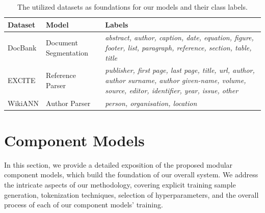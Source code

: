 \begin{table}[!ht]
	\centering
	\begin{tabularx}{\textwidth}{l|l|X}
        \textbf{Dataset} & \textbf{Model} & \textbf{Labels}\\ \hline
        DocBank & Document Segmentation & \textit{abstract, author, caption, date, equation, figure, footer, list, paragraph, reference, section, table, title}\\\hline
        EXCITE & Reference Parser & \textit{publisher, first page, last page, title, url, author, author surname, author given-name, volume, source, editor, identifier, year, issue, other}\\\hline
        WikiANN & Author Parser & \textit{person, organisation, location}\\ \hline
    \end{tabularx}
	\caption{The utilized datasets as foundations for our models and their class labels.}
	\label{tab:datasets_label}
\end{table}

\section{Component Models}\label{sec:methods_models}
In this section, we provide a detailed exposition of the proposed modular component models, which build the foundation of our overall system. We address the intricate aspects of our methodology, covering explicit training sample generation, tokenization techniques, selection of hyperparameters, and the overall process of each of our component models' training.


